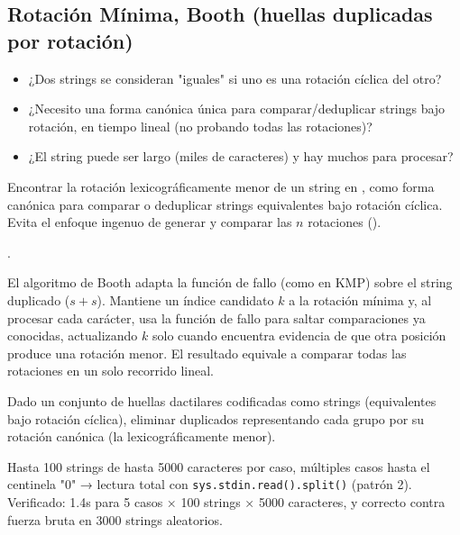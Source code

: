 \subsection{Rotación Mínima, Booth (huellas duplicadas por rotación)}
\label{alg:9-1}


\begin{itemize}
\item ¿Dos strings se consideran "iguales" si uno es una rotación cíclica del otro?
\item ¿Necesito una forma canónica única para comparar/deduplicar strings bajo rotación, en tiempo lineal (no  probando todas las rotaciones)?
\item ¿El string puede ser largo (miles de caracteres) y hay muchos para procesar?
\end{itemize}

 Encontrar la rotación lexicográficamente menor de un string en , como forma canónica para comparar o deduplicar strings equivalentes bajo rotación cíclica. Evita el enfoque ingenuo de generar y comparar las $n$ rotaciones ().

 .

 El algoritmo de Booth adapta la función de fallo (como en KMP) sobre el string duplicado ($s+s$). Mantiene un índice candidato $k$ a la rotación mínima y, al procesar cada carácter, usa la función de fallo para saltar comparaciones ya conocidas, actualizando $k$ solo cuando encuentra evidencia de que otra posición produce una rotación menor. El resultado equivale a comparar todas las rotaciones en un solo recorrido lineal.~\cite{booth1980}


Dado un conjunto de huellas dactilares codificadas como strings (equivalentes bajo rotación cíclica), eliminar duplicados representando cada grupo por su rotación canónica (la lexicográficamente menor).

 Hasta 100 strings de hasta 5000 caracteres por caso, múltiples casos hasta el centinela "0" → lectura total con \texttt{sys.stdin.read().split()} (patrón 2). Verificado: \aprox{}1.4s para 5 casos × 100 strings × 5000 caracteres, y correcto contra fuerza bruta en 3000 strings aleatorios.



